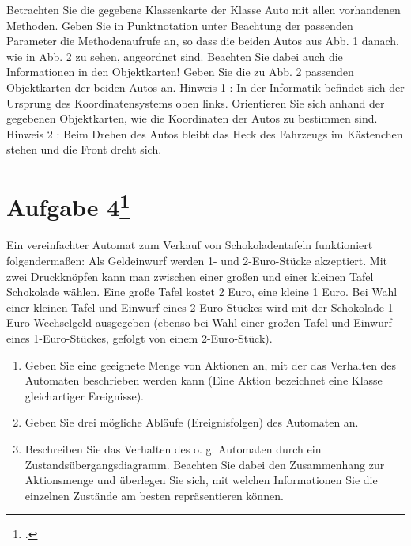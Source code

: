 \documentclass{lehramt-informatik-haupt}
\begin{document}
Betrachten Sie die gegebene Klassenkarte der Klasse Auto mit allen
vorhandenen Methoden. Geben Sie in Punktnotation unter Beachtung der
passenden Parameter die Methodenaufrufe an, so dass die beiden Autos aus
Abb. 1 danach, wie in Abb. 2 zu sehen, angeordnet sind. Beachten Sie
dabei auch die Informationen in den Objektkarten! Geben Sie die zu Abb.
2 passenden Objektkarten der beiden Autos an. Hinweis 1 : In der
Informatik befindet sich der Ursprung des Koordinatensystems oben links.
Orientieren Sie sich anhand der gegebenen Objektkarten, wie die
Koordinaten der Autos zu bestimmen sind. Hinweis 2 : Beim Drehen des
Autos bleibt das Heck des Fahrzeugs im Kästenchen stehen und die Front
dreht sich.

%

\section{Aufgabe 4\footcite{oomup:ab:1}}

Ein vereinfachter Automat zum Verkauf von Schokoladentafeln funktioniert
folgendermaßen: Als Geldeinwurf werden 1- und 2-Euro-Stücke akzeptiert.
Mit zwei Druckknöpfen kann man zwischen einer großen und einer kleinen
Tafel Schokolade wählen. Eine große Tafel kostet 2 Euro, eine kleine 1
Euro. Bei Wahl einer kleinen Tafel und Einwurf eines 2-Euro-Stückes wird
mit der Schokolade 1 Euro Wechselgeld ausgegeben (ebenso bei Wahl einer
großen Tafel und Einwurf eines 1-Euro-Stückes, gefolgt von einem
2-Euro-Stück).

\renewcommand{\labelenumi}{(\alph{enumi})}
\begin{enumerate}


\item Geben Sie eine geeignete Menge von Aktionen an, mit der das
Verhalten des Automaten beschrieben werden kann (Eine Aktion bezeichnet
eine Klasse gleichartiger Ereignisse).


\item Geben Sie drei mögliche Abläufe (Ereignisfolgen) des Automaten an.


\item Beschreiben Sie das Verhalten des o. g. Automaten durch ein
Zustandsübergangsdiagramm. Beachten Sie dabei den Zusammenhang zur
Aktionsmenge und überlegen Sie sich, mit welchen Informationen Sie die
einzelnen Zustände am besten repräsentieren können.

\end{enumerate}
\end{document}
